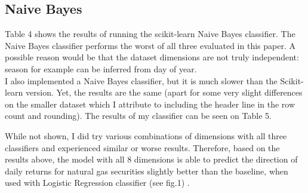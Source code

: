 \documentclass[conference,letterpaper]{IEEEtran}
\begin{document}
\subsection{Naive Bayes}
Table 4 shows the results of running the scikit-learn Naive Bayes classifier. The Naive Bayes classifier performs the worst of all three evaluated in this paper. A possible reason
would be that the dataset dimensions are not truly independent: season for example can be inferred from day of year. \\
I also implemented a Naive Bayes classifier, but it is much slower than the Scikit-learn version. Yet, the results are the same
(apart for some very slight differences on the smaller dataset which I attribute to including the header line in the row count and rounding). The results of my classifier
can be seen on Table 5.


While not shown, I did try various combinations of dimensions with all three classifiers and experienced similar or worse results. Therefore,
based on the results above, the model with all 8 dimensions is able to predict the direction of daily returns for natural gas securities slightly
better than the baseline, when used with Logistic Regression classifier (see fig.1) . \\
\end{document}
